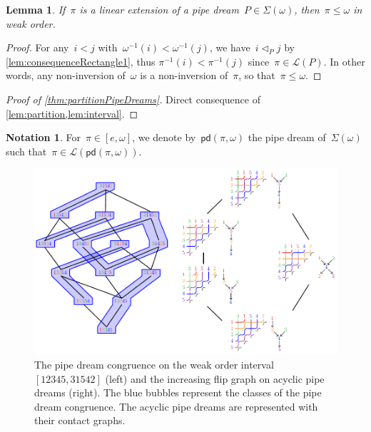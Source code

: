 \documentclass[reqno]{amsart}
\newtheorem{lemma}[theorem]{Lemma}
\theoremstyle{definition}
\newtheorem{notation}[theorem]{Notation}
\newcommand{\acyclicPipeDreams}{\Sigma} %
\newcommand{\linearExtensions}{\mathcal{L}} %
\newcommand{\insertion}[2]{\mathsf{pd}(#1,#2)} %
\newcommand{\less}{\vartriangleleft} %
\newcommand{\contactLess}[1]{\less_{#1}} %
\begin{document}
\begin{lemma}
\label{lem:interval}
If~$\pi$ is a linear extension of a pipe dream~$P \in \acyclicPipeDreams(\omega)$, then~$\pi \le \omega$ in weak order.
\end{lemma}

\begin{proof}
For any~$i < j$ with~$\omega^{-1}(i) < \omega^{-1}(j)$, we have~$i \contactLess{P} j$ by \cref{lem:consequenceRectangle1}, thus ${\pi^{-1}(i) < \pi^{-1}(j)}$ since~$\pi \in \linearExtensions(P)$.
In other words, any non-inversion of~$\omega$ is a non-inversion of~$\pi$, so that~${\pi \le \omega}$.
\end{proof}

\begin{proof}[Proof of \cref{thm:partitionPipeDreams}]
Direct consequence of \cref{lem:partition,lem:interval}.
\end{proof}

\begin{notation}
For~$\pi \in [e, \omega]$, we denote by~$\insertion{\pi}{\omega}$ the pipe dream of~$\acyclicPipeDreams(\omega)$ such that~${\pi \in \linearExtensions(\insertion{\pi}{\omega})}$.
\end{notation}

\begin{figure}
	\centerline{\includegraphics[scale=1]{latticeAcyclicPipeDreams}}
	\caption{The pipe dream congruence on the weak order interval~$[12345, 31542]$ (left) and the increasing flip graph on acyclic pipe dreams (right). The blue bubbles represent the classes of the pipe dream congruence. The acyclic pipe dreams are represented with their contact graphs.}
	\label{fig:latticeAcyclicPipeDreams}
\end{figure}
\end{document}
